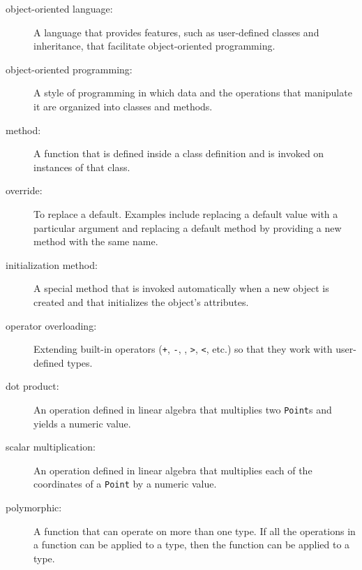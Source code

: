 \begin{description}

\item[object-oriented language:] A language that provides
features, such as user-defined classes and inheritance, that facilitate
object-oriented programming.

\item[object-oriented programming:] A style of programming in which
data and the operations that manipulate it are organized into classes
and methods.

\item[method:] A function that is defined inside a class definition and
is invoked on instances of that class.

\item[override:] To replace a default.  Examples include replacing a default
value with a particular argument and replacing a default method
by providing a new method with the same name.

\item[initialization method:] A special method that is invoked automatically
when a new object is created and that initializes the object's attributes.

\item[operator overloading:] Extending built-in operators
({\tt +}, {\tt -}, {\tt *}, {\tt >}, {\tt <}, etc.) so that they work
with user-defined types.

\item[dot product:] An operation defined in linear algebra that
multiplies two {\tt Point}s and yields a numeric value.

\item[scalar multiplication:] An operation defined in linear algebra that
multiplies each of the coordinates of a {\tt Point} by a numeric
value.

\item[polymorphic:] A function that can operate on more than one
type.  If all the operations in a function can be
applied to a type, then the function can be applied to a type.



\end{description}
